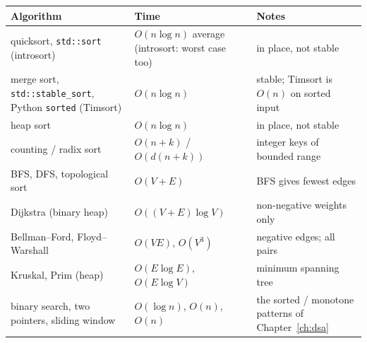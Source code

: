 \documentclass[10pt,a4paper,openany,oneside]{report}
\begin{document}
\begin{center}\small
\begin{xltabular}{\textwidth}{@{}L{4.4cm}L{3.4cm}Y@{}}
\toprule
\textbf{Algorithm} & \textbf{Time} & \textbf{Notes}\\
\midrule\endhead
quicksort, \texttt{std::sort} (introsort) & $O(n\log n)$ average (introsort: worst case too) & in place, not stable\\
merge sort, \texttt{std::stable\_sort}, Python \texttt{sorted} (Timsort) & $O(n\log n)$ & stable; Timsort is $O(n)$ on sorted input\\
heap sort & $O(n\log n)$ & in place, not stable\\
counting / radix sort & $O(n+k)$ / $O(d(n+k))$ & integer keys of bounded range\\
BFS, DFS, topological sort & $O(V+E)$ & BFS gives fewest edges\\
Dijkstra (binary heap) & $O((V+E)\log V)$ & non-negative weights only\\
Bellman--Ford, Floyd--Warshall & $O(VE)$, $O(V^3)$ & negative edges; all pairs\\
Kruskal, Prim (heap) & $O(E\log E)$, $O(E\log V)$ & minimum spanning tree\\
binary search, two pointers, sliding window & $O(\log n)$, $O(n)$, $O(n)$ & the sorted / monotone patterns of Chapter~\ref{ch:dsa}\\
\bottomrule
\end{xltabular}
\end{center}
\end{document}
